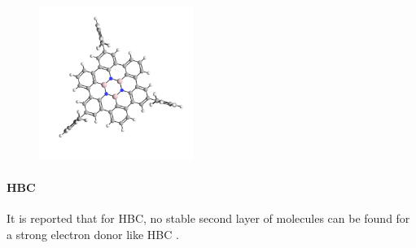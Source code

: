 \label{section_HBBNC}

\begin{figure}\centering
	\includegraphics[angle=90, width=5cm]{./images/molecules/max-zoom/HBBNC-600}
	\caption{}
	\label{fig:HBBNC-molecule}
\end{figure}


\paragraph{HBC}It is reported that for HBC, no stable second layer of molecules can be found for a strong electron donor like HBC \cite{de_feyter_two-dimensional_2003}.